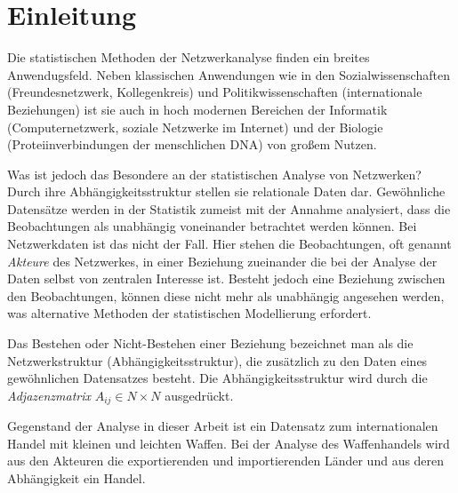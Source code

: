 \documentclass[a4paper,ngerman,oneside,titlepage,bibliography=totoc,11pt]{scrreprt}
\begin{document}
\begin{abstract}


\begin{center}
{\it \bf Abstract} 
\end{center}

hier kommt noch das abstract rein
 


\end{abstract}




\tableofcontents




\chapter{Einleitung}
Die statistischen Methoden der Netzwerkanalyse finden ein breites Anwendugsfeld. Neben klassischen Anwendungen wie in den Sozialwissenschaften (Freundesnetzwerk, Kollegenkreis)  und Politikwissenschaften (internationale Beziehungen) ist sie auch in hoch modernen Bereichen der Informatik (Computernetzwerk, soziale Netzwerke im Internet) und der Biologie (Proteiinverbindungen der menschlichen DNA) von großem Nutzen.

Was ist jedoch das Besondere an der statistischen Analyse von Netzwerken? Durch ihre Abhängigkeitsstruktur stellen sie relationale Daten dar. Gewöhnliche Datensätze werden in der Statistik zumeist mit der Annahme analysiert, dass die Beobachtungen als unabhängig voneinander betrachtet werden können. Bei Netzwerkdaten ist das nicht der Fall. Hier stehen die Beobachtungen, oft genannt \emph{Akteure} des Netzwerkes, in einer Beziehung zueinander die bei der Analyse der Daten  selbst von zentralen Interesse ist. Besteht jedoch eine Beziehung zwischen den Beobachtungen, können diese nicht mehr als unabhängig angesehen werden, was alternative Methoden der statistischen Modellierung erfordert. 

Das Bestehen oder Nicht-Bestehen einer Beziehung bezeichnet man als die Netzwerkstruktur (Abhängigkeitsstruktur), die zusätzlich zu den Daten eines gewöhnlichen Datensatzes besteht. Die Abhängigkeitsstruktur wird durch die \emph{Adjazenzmatrix} $A_{ij} \in N \times N$ ausgedrückt.

Gegenstand der Analyse in dieser Arbeit ist ein Datensatz zum internationalen Handel mit kleinen und leichten Waffen. 
Bei der Analyse des Waffenhandels wird aus den Akteuren die exportierenden und importierenden Länder und aus deren Abhängigkeit ein Handel.
\end{document}
